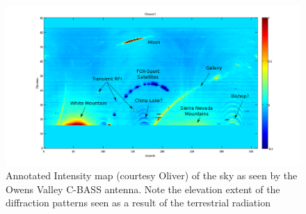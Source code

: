 \begin{figure}[ht]
 \centering
 \includegraphics[width=\textwidth]{./images/NotchFilter/altazmapannotated.png}
 \caption{Annotated Intensity map (courtesy Oliver) of the sky as seen by the Owens Valley C-BASS antenna. Note the elevation extent of the diffraction patterns seen as a result of the terrestrial radiation }
 \label{fig:intensity}
\end{figure}


